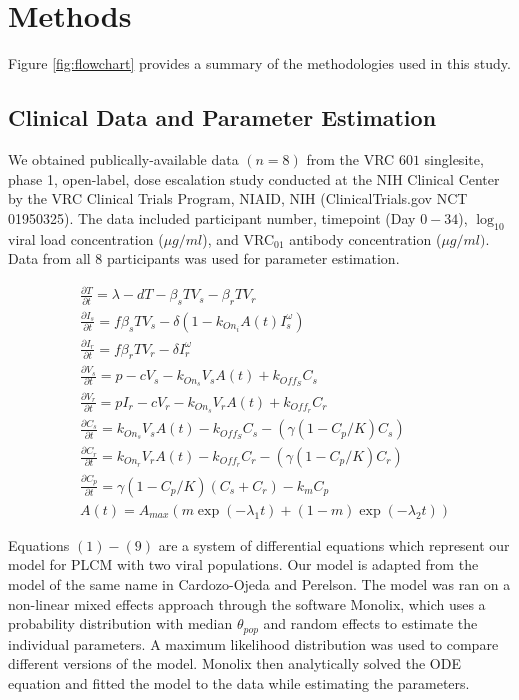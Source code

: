 \documentclass[fleqn,10pt]{wlscirep}
\begin{document}
\section*{Methods}
Figure \ref{fig:flowchart} provides a summary of the methodologies used in this study.

\subsection*{Clinical Data and Parameter Estimation}
We obtained publically-available data $(n=8)$ from the VRC $601$ singlesite, phase 1, open-label, dose escalation study conducted at the NIH Clinical Center by the VRC Clinical Trials Program, NIAID, NIH (ClinicalTrials.gov NCT 01950325).\cite{Lynch:2015} The data included participant number, timepoint (Day $0-34$), $\log_{10}$ viral load concentration ($\mu g/ml$), and VRC$_{01}$ antibody concentration ($\mu g/ml)$. Data from all $8$ participants was used for parameter estimation.

\begin{align}
    & \frac{\partial T}{\partial t}  = \lambda - d  T - \beta_s  T  V_s - \beta_r  T  V_r \\
    & \frac{\partial I_s}{\partial t} = f  \beta_s T  V_s - \delta (1 - k_{On_i}  A(t)  I_s^{\omega}) \\
    & \frac{\partial I_r}{\partial t} = f  \beta_r  T  V_r - \delta  I_r^{\omega} \\
    & \frac{\partial V_s}{\partial t} = p  - c  V_s - k_{On_s}  V_s  A(t) + k_{Off_S} C_s \\
    & \frac{\partial V_r}{\partial t} = p  I_r - c  V_r - k_{On_s}  V_r  A(t) + k_{Off_r} C_r \\
    & \frac{\partial C_s}{\partial t} = k_{On_s}  V_s  A(t) - k_{Off_S}  C_s - (\gamma  (1 - C_p/K)  C_s) \\
    & \frac{\partial C_r}{\partial t} = k_{On_r}  V_r  A(t) - k_{Off_r}  C_r - (\gamma  ( 1 - C_p/K)  C_r) \\
    & \frac{\partial C_p}{\partial t} = \gamma  (1 - C_p / K)  (C_s + C_r) - k_m  C_p \\
    & A(t) = A_{max}  (m  \exp(-\lambda_1  t)+(1-m)  \exp(-\lambda_2  t))
\end{align}

\noindent Equations $(1)-(9)$ are a system of differential equations which represent our model for PLCM with two viral populations. Our model is adapted from the model of the same name in Cardozo-Ojeda and Perelson.\cite{Cardozo:2021} The model was ran on a non-linear mixed effects approach through the software Monolix, which uses a probability distribution with median {$\theta_{pop}$} and random effects to estimate the individual parameters. A maximum likelihood distribution was used to compare different versions of the model. Monolix then analytically solved the ODE equation and fitted the model to the data while estimating the parameters.
\end{document}
